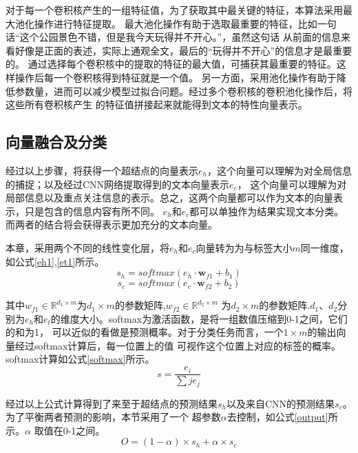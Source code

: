 对于每一个卷积核产生的一组特征值，为了获取其中最关键的特征，本算法采用最大池化操作进行特征提取。
最大池化操作有助于选取最重要的特征，比如一句话“这个公园景色不错，但是我今天玩得并不开心。”，虽然这句话
从前面的信息来看好像是正面的表述，实际上通观全文，最后的“玩得并不开心”的信息才是最重要的。
通过选择每个卷积核中的提取的特征的最大值，可捕获其最重要的特征。这样操作后每一个卷积核得到特征就是一个值。
另一方面，采用池化操作有助于降低参数量，进而可以减少模型过拟合问题。经过多个卷积核的卷积池化操作后，将这些所有卷积核产生
的特征值拼接起来就能得到文本的特性向量表示。

\subsection{向量融合及分类}
经过以上步骤，将获得一个超结点的向量表示$e_h$，这个向量可以理解为对全局信息的捕捉；以及经过CNN网络提取得到的文本向量表示$e_c$，
这个向量可以理解为对局部信息以及重点关注信息的表示。总之，这两个向量都可以作为文本的向量表示，只是包含的信息内容有所不同。
$e_h$和$e_c$都可以单独作为结果实现文本分类。而两者的结合将会获得表示更加充分的文本向量。

本章，采用两个不同的线性变化层，将$e_h$和$e_c$向量转为为与标签大小$m$同一维度，如公式\ref{eh1},\ref{et1}所示。
\begin{equation}\label{eh1}
    s_h=softmax(e_h \cdot \mathbf{w}_{f1}+b_1)
\end{equation}
\begin{equation}\label{et1}
    s_c=softmax(e_c \cdot \mathbf{w}_{f2}+b_2)
\end{equation}

其中$w_{f1}\in \mathbb{R}^{d_1 \times m}$为$d_1\times m$的参数矩阵,$w_{f2}\in \mathbb{R}^{d_2 \times m}$
为$d_2\times m$的参数矩阵.$d_1$、$d_2$分别为$e_h$和$e_t$的维度大小。softmax为激活函数，是将一组数值压缩到0-1之间，它们的和为1，
可以近似的看做是预测概率。对于分类任务而言，一个$1\times m$的输出向量经过softmax计算后，每一位置上的值
可视作这个位置上对应的标签的概率。softmax计算如公式\ref{softmax}所示。
\begin{equation}\label{softmax}
    s=\frac{e_i}{\sum{j}{e_j}}
\end{equation}

经过以上公式计算得到了来至于超结点的预测结果$s_h$以及来自CNN的预测结果$s_c$。为了平衡两者预测的影响，本节采用了一个
超参数$\alpha$去控制，如公式\ref{output}所示。$\alpha$ 取值在0-1之间。
\begin{equation}\label{output}
    O=(1-\alpha) \times s_h+\alpha \times s_c
\end{equation}

